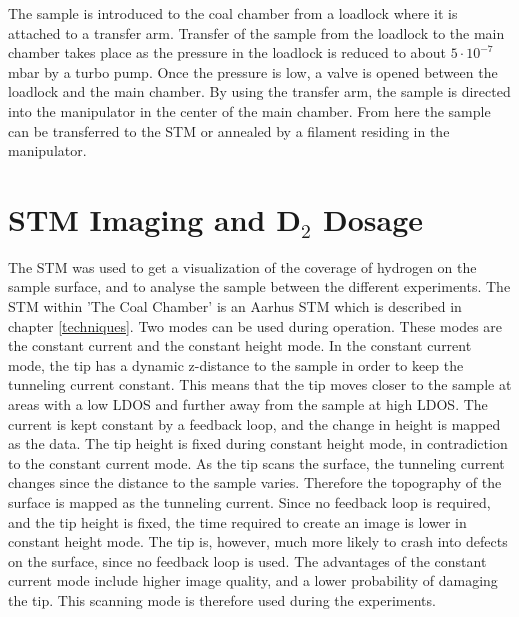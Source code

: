  The sample is introduced to the coal chamber from a loadlock where it is attached to a transfer arm. Transfer of the sample from the loadlock to the main chamber takes place as the pressure in the loadlock is reduced to about $5\cdot 10^{-7}$mbar by a turbo pump. Once the pressure is low, a valve is opened between the loadlock and the main chamber. By using the transfer arm, the sample is directed into the manipulator in the center of the main chamber. From here the sample can be transferred to the STM or annealed by a filament residing in the manipulator.

\section{STM Imaging and D$_2$ Dosage}

The STM was used to get a visualization of the coverage of hydrogen on the sample surface, and to analyse the sample between the different experiments. The STM within 'The Coal Chamber' is an Aarhus STM which is described in chapter \ref{techniques}. Two modes can be used during operation. These modes are the constant current and the constant height mode. In the constant current mode, the tip has a dynamic z-distance to the sample in order to keep the tunneling current constant. This means that the tip moves closer to the sample at areas with a low LDOS and further away from the sample at high LDOS. The current is kept constant by a feedback loop, and the change in height is mapped as the data. The tip height is fixed during constant height mode, in contradiction to the constant current mode. As the tip scans the surface, the tunneling current changes since the distance to the sample varies. Therefore the topography of the surface is mapped as the tunneling current. Since no feedback loop is required, and the tip height is fixed, the time required to create an image is lower in constant height mode. The tip is, however, much more likely to crash into defects on the surface, since no feedback loop is used. The advantages of the constant current mode include higher image quality, and a lower probability of damaging the tip. This scanning mode is therefore used during the experiments.

